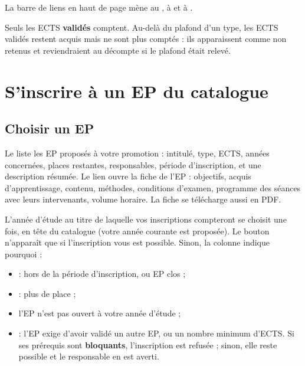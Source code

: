 \documentclass[11pt,a4paper]{article}
\begin{document}
La barre de liens en haut de page mène au , à  et à .

\begin{astuce}
Seuls les ECTS \textbf{validés} comptent. Au-delà du plafond d'un type, les ECTS validés restent
acquis mais ne sont plus comptés : ils apparaissent comme \og non retenus\fg{} et reviendraient
au décompte si le plafond était relevé.
\end{astuce}

\section{S'inscrire à un EP du catalogue}

\subsection{Choisir un EP}

Le  liste les EP proposés à votre promotion : intitulé, type, ECTS,
années concernées, places restantes, responsables, période d'inscription, et une description
résumée. Le lien  ouvre la fiche de l'EP : objectifs, acquis d'apprentissage, contenu, méthodes,
conditions d'examen, programme des séances avec leurs intervenants, volume horaire. La fiche
se télécharge aussi en PDF.



L'année d'étude au titre de laquelle vos inscriptions compteront se choisit une fois, en tête
du catalogue (votre année courante est proposée). Le bouton  n'apparaît que
si l'inscription vous est possible. Sinon, la
colonne indique pourquoi :
\begin{itemize}
  \item {} : hors de la période d'inscription, ou EP clos ;
  \item {} : plus de place ;
  \item l'EP n'est pas ouvert à votre année d'étude ;
  \item {} : l'EP exige d'avoir validé un autre EP, ou un nombre
    minimum d'ECTS. Si ses prérequis sont \textbf{bloquants}, l'inscription est refusée ; sinon,
    elle reste possible et le responsable en est averti.
\end{itemize}
\end{document}
